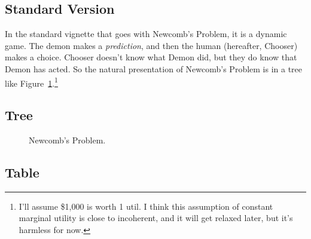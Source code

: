 \documentclass[
  10pt,
  letterpaper,
  DIV=11,
  numbers=noendperiod,
  twoside]{scrartcl}
\begin{document}
\subsection{Standard Version}\label{standard-version}

In the standard vignette that goes with Newcomb's Problem, it is a
dynamic game. The demon makes a \emph{prediction}, and then the human
(hereafter, Chooser) makes a choice. Chooser doesn't know what Demon
did, but they do know that Demon has acted. So the natural presentation
of Newcomb's Problem is in a tree like
Figure~\ref{fig-standard-newcomb}.\footnote{I'll assume \$1,000 is worth
  1 util. I think this assumption of constant marginal utility is close
  to incoherent, and it will get relaxed later, but it's harmless for
  now.}

\subsection{Tree}

\begin{figure}


\caption{\label{fig-standard-newcomb}Newcomb's Problem.}

\end{figure}%

\subsection{Table}
\end{document}
